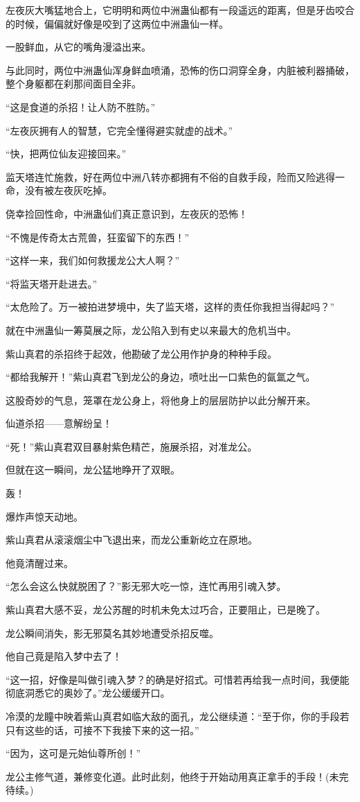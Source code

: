 \begin{this_body}
左夜灰大嘴猛地合上，它明明和两位中洲蛊仙都有一段遥远的距离，但是牙齿咬合的时候，偏偏就好像是咬到了这两位中洲蛊仙一样。

一股鲜血，从它的嘴角漫溢出来。

与此同时，两位中洲蛊仙浑身鲜血喷涌，恐怖的伤口洞穿全身，内脏被利器捅破，整个身躯都在刹那间面目全非。

“这是食道的杀招！让人防不胜防。”

“左夜灰拥有人的智慧，它完全懂得避实就虚的战术。”

“快，把两位仙友迎接回来。”

监天塔连忙施救，好在两位中洲八转亦都拥有不俗的自救手段，险而又险逃得一命，没有被左夜灰吃掉。

侥幸捡回性命，中洲蛊仙们真正意识到，左夜灰的恐怖！

“不愧是传奇太古荒兽，狂蛮留下的东西！”

“这样一来，我们如何救援龙公大人啊？”

“将监天塔开赴进去。”

“太危险了。万一被拍进梦境中，失了监天塔，这样的责任你我担当得起吗？”

就在中洲蛊仙一筹莫展之际，龙公陷入到有史以来最大的危机当中。

紫山真君的杀招终于起效，他勘破了龙公用作护身的种种手段。

“都给我解开！”紫山真君飞到龙公的身边，喷吐出一口紫色的氤氲之气。

这股奇妙的气息，笼罩在龙公身上，将他身上的层层防护以此分解开来。

仙道杀招——意解纷呈！

“死！”紫山真君双目暴射紫色精芒，施展杀招，对准龙公。

但就在这一瞬间，龙公猛地睁开了双眼。

轰！

爆炸声惊天动地。

紫山真君从滚滚烟尘中飞退出来，而龙公重新屹立在原地。

他竟清醒过来。

“怎么会这么快就脱困了？”影无邪大吃一惊，连忙再用引魂入梦。

紫山真君大感不妥，龙公苏醒的时机未免太过巧合，正要阻止，已是晚了。

龙公瞬间消失，影无邪莫名其妙地遭受杀招反噬。

他自己竟是陷入梦中去了！

“这一招，好像是叫做引魂入梦？的确是好招式。可惜若再给我一点时间，我便能彻底洞悉它的奥妙了。”龙公缓缓开口。

冷漠的龙瞳中映着紫山真君如临大敌的面孔，龙公继续道：“至于你，你的手段若只有这些的话，可接不下我接下来的这一招。”

“因为，这可是元始仙尊所创！”

龙公主修气道，兼修变化道。此时此刻，他终于开始动用真正拿手的手段！(未完待续。)

\end{this_body}

